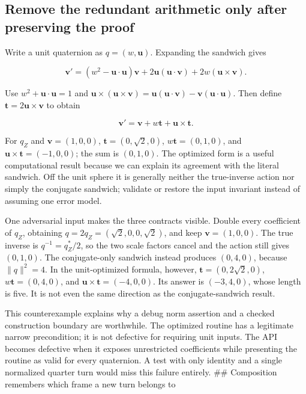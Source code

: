 \subsection{Remove the redundant arithmetic only after preserving the proof}\label{01-foundations-i-ch019-remove-the-redundant-arithmetic-only-after-preserving-the-proof}

\hypertarget{01-foundations-i-ch019-remove-the-redundant-arithmetic-only-after-preserving-the-proof}{}

Write a unit quaternion as \(q=(w,\mathbf u)\). Expanding the sandwich gives

\[
\mathbf v'=(w^2-\mathbf u\cdot\mathbf u)\mathbf v
+2\mathbf u(\mathbf u\cdot\mathbf v)
+2w(\mathbf u\times\mathbf v).
\]

Use \(w^2+\mathbf u\cdot\mathbf u=1\) and \(\mathbf u\times(\mathbf u\times\mathbf v)=\mathbf u(\mathbf u\cdot\mathbf v)-\mathbf v(\mathbf u\cdot\mathbf u)\). Then define \(\mathbf t=2\mathbf u\times\mathbf v\) to obtain

\[
\mathbf v'=\mathbf v+w\mathbf t+\mathbf u\times\mathbf t.
\]

For \(q_Z\) and \(\mathbf v=(1,0,0)\), \(\mathbf t=(0,\sqrt2,0)\), \(w\mathbf t=(0,1,0)\), and \(\mathbf u\times\mathbf t=(-1,0,0)\); the sum is \((0,1,0)\). The optimized form is a useful computational result because we can explain its agreement with the literal sandwich. Off the unit sphere it is generally neither the true-inverse action nor simply the conjugate sandwich; validate or restore the input invariant instead of assuming one error model.

One adversarial input makes the three contracts visible. Double every coefficient of \(q_Z\), obtaining \(q=2q_Z=(\sqrt2,0,0,\sqrt2)\), and keep \(\mathbf v=(1,0,0)\). The true inverse is \(q^{-1}=q_Z^*/2\), so the two scale factors cancel and the action still gives \((0,1,0)\). The conjugate-only sandwich instead produces \((0,4,0)\), because \(\|q\|^2=4\). In the unit-optimized formula, however, \(\mathbf t=(0,2\sqrt2,0)\), \(w\mathbf t=(0,4,0)\), and \(\mathbf u\times\mathbf t=(-4,0,0)\). Its answer is \((-3,4,0)\), whose length is five. It is not even the same direction as the conjugate-sandwich result.

This counterexample explains why a debug norm assertion and a checked construction boundary are worthwhile. The optimized routine has a legitimate narrow precondition; it is not defective for requiring unit inputs. The API becomes defective when it exposes unrestricted coefficients while presenting the routine as valid for every quaternion. A test with only identity and a single normalized quarter turn would miss this failure entirely. \#\# Composition remembers which frame a new turn belongs to

